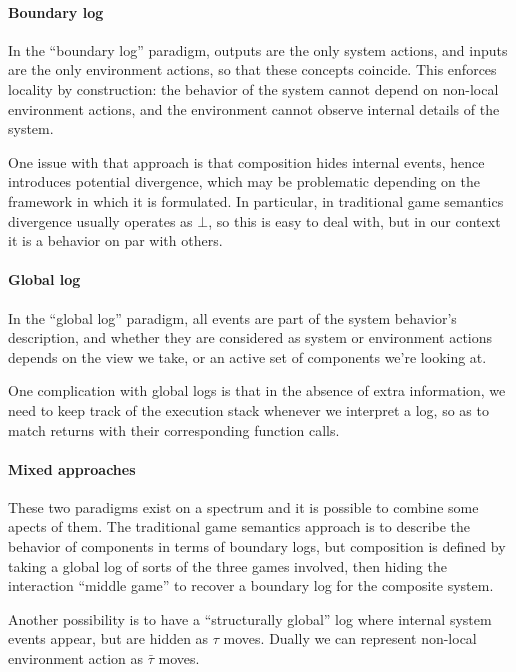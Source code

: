 \documentclass[11pt]{article}
\begin{document}
\paragraph{Boundary log}

In the ``boundary log'' paradigm,
outputs are the only system actions, and
inputs are the only environment actions,
so that these concepts coincide.
This enforces locality by construction:
the behavior of the system
cannot depend on non-local environment actions,
and the environment
cannot observe internal details of the system.

One issue with that approach is that
composition hides internal events,
hence introduces potential divergence,
which may be problematic depending on the
framework in which it is formulated.
In particular,
in traditional game semantics
divergence usually operates as $\bot$,
so this is easy to deal with,
but in our context it is a behavior on par with others.

\paragraph{Global log}

In the ``global log'' paradigm,
all events are part of the system behavior's description,
and whether they are considered as system or environment actions
depends on the view we take,
or an active set of components we're looking at.

One complication with global logs is that
in the absence of extra information,
we need to keep track of the execution stack whenever
we interpret a log,
so as to match returns with their corresponding function calls.


\paragraph{Mixed approaches}

These two paradigms exist on a spectrum and
it is possible to combine some apects of them.
The traditional game semantics approach
is to describe the behavior of components in terms of boundary logs,
but composition is defined by taking a global log of sorts
of the three games involved,
then hiding the interaction ``middle game''
to recover a boundary log for the composite system.

Another possibility is to have a ``structurally global'' log
where internal system events appear, but are hidden as $\tau$ moves.
Dually we can represent
non-local environment action as $\bar{\tau}$ moves.


\end{document}
